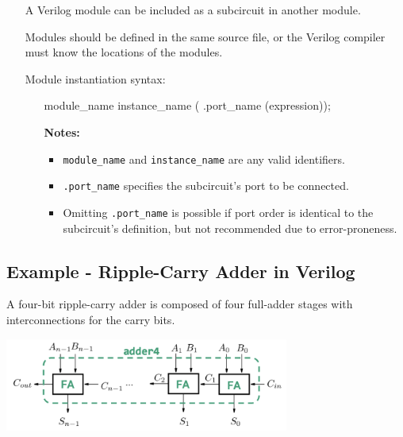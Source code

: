 \documentclass[12pt,openany]{book}
\begin{document}
			      	\begin{itemize}
			      		\item[] A Verilog module can be included as a subcircuit in another module.
			      		\item[] Modules should be defined in the same source file, or the Verilog compiler must know the locations of the modules.
			      		\item[] Module instantiation syntax:
			      		      \begin{itemize}
			      		      	\item[] \begin{vhdl}
{module\_name instance\_name ( .port\_name (expression));}
			      		      	\end{vhdl}
			      		      	\item[\textbf{Notes:}]
			      		      	      \begin{itemize}
			      		      	      	\item \texttt{module\_name} and \texttt{instance\_name} are any valid identifiers.
			      		      	      	\item \texttt{.port\_name} specifies the subcircuit's port to be connected.
			      		      	      	\item Omitting \texttt{.port\_name} is possible if port order is identical to the subcircuit's definition, but not recommended due to error-proneness.
			      		      	      \end{itemize}
			      		      \end{itemize}
			      	\end{itemize}
			      	
			      	\subsection{Example - Ripple-Carry Adder in Verilog}
			      	A four-bit ripple-carry adder is composed of four full-adder stages with interconnections for the carry bits.
			      	
			      	
			      	\begin{center}
			      		\includegraphics[width=0.70\textwidth]{circuits/10.2.4_2.png}
			      	\end{center}
			      	
\end{document}
